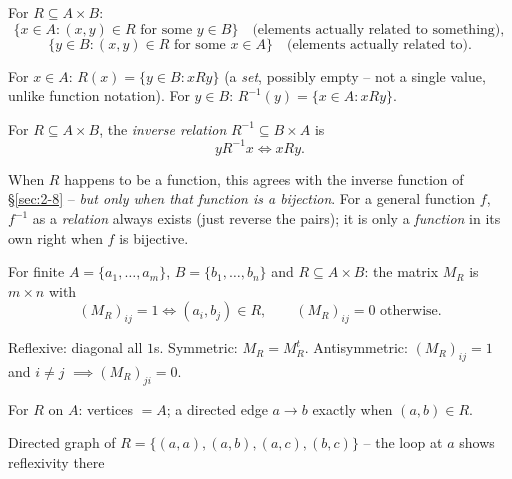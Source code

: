 \documentclass[11pt]{article}
\begin{document}
\begin{definition}
For $R \subseteq A \times B$:
\[
\{x \in A : (x,y) \in R \text{ for some } y \in B\} \quad \text{(elements actually related to something)},
\]
\[
\{y \in B : (x,y) \in R \text{ for some } x \in A\} \quad \text{(elements actually related to)}.
\]
\end{definition}

\begin{definition}[$R(x)$, $R^{-1}(y)$ -- CN notation]
For $x \in A$: $R(x) = \{y \in B : xRy\}$ (a \emph{set}, possibly empty -- not a single value, unlike function notation). For $y \in B$: $R^{-1}(y) = \{x \in A : xRy\}$.
\end{definition}

\begin{definition}
For $R \subseteq A \times B$, the \emph{inverse relation} $R^{-1} \subseteq B \times A$ is
\[
y R^{-1} x \iff x R y.
\]
\end{definition}

\begin{note}
When $R$ happens to be a function, this agrees with the inverse function of \S\ref{sec:2-8} -- \emph{but only when that function is a bijection}. For a general function $f$, $f^{-1}$ as a \emph{relation} always exists (just reverse the pairs); it is only a \emph{function} in its own right when $f$ is bijective.
\end{note}

\begin{definition}
For finite $A=\{a_1,\dots,a_m\}$, $B=\{b_1,\dots,b_n\}$ and $R\subseteq A\times B$: the matrix $M_R$ is $m\times n$ with
\[
(M_R)_{ij} = 1 \iff (a_i,b_j)\in R, \qquad (M_R)_{ij}=0 \text{ otherwise.}
\]
\end{definition}

\begin{note}
Reflexive: diagonal all $1$s. Symmetric: $M_R = M_R^t$. Antisymmetric: $(M_R)_{ij}=1$ and $i\neq j$ $\implies (M_R)_{ji}=0$.
\end{note}

\begin{definition}
For $R$ on $A$: vertices $=A$; a directed edge $a\to b$ exactly when $(a,b)\in R$.
\end{definition}

\begin{center}
\end{center}
\begin{center}
\small Directed graph of $R=\{(a,a),(a,b),(a,c),(b,c)\}$ -- the loop at $a$ shows reflexivity there
\end{center}
\end{document}
